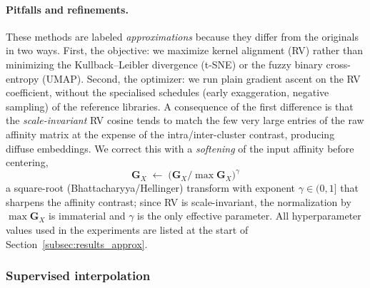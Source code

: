 \documentclass[11pt]{article}
\begin{document}
	\paragraph{Pitfalls and refinements.} These methods are labeled \emph{approximations} because they differ from the originals in two ways. First, the objective: we maximize kernel alignment (RV) rather than minimizing the Kullback--Leibler divergence (t-SNE) or the fuzzy binary cross-entropy (UMAP). Second, the optimizer: we run plain gradient ascent on the RV coefficient, without the specialised schedules (early exaggeration, negative sampling) of the reference libraries. A consequence of the first difference is that the \emph{scale-invariant} RV cosine tends to match the few very large entries of the raw affinity matrix at the expense of the intra/inter-cluster contrast, producing diffuse embeddings. We correct this with a \emph{softening} of the input affinity before centering,
	$$
	\mathbf{G}_X \;\longleftarrow\; \bigl(\mathbf{G}_X / \max \mathbf{G}_X\bigr)^{\gamma}
	$$
	a square-root (Bhattacharyya/Hellinger) transform with exponent $\gamma\in(0,1]$ that sharpens the affinity contrast; since RV is scale-invariant, the normalization by $\max\mathbf{G}_X$ is immaterial and $\gamma$ is the only effective parameter. All hyperparameter values used in the experiments are listed at the start of Section~\ref{subsec:results_approx}.
	
	\subsubsection{Supervised interpolation}
	\label{subsec:tested_supervised}
	
\end{document}
